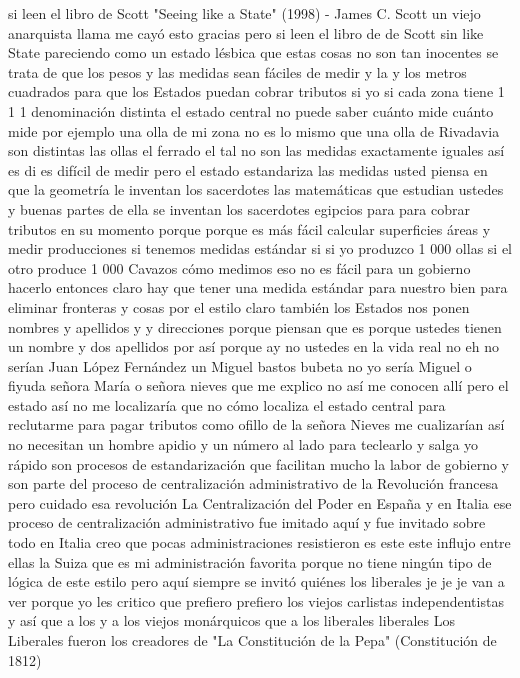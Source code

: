si leen el libro de Scott
"Seeing like a State" (1998) - James C. Scott
un viejo anarquista llama me cayó esto
gracias pero si leen el libro de de Scott sin like State
pareciendo como un estado lésbica que estas cosas no son tan inocentes se trata de que los pesos y las medidas sean fáciles de medir
y la y los metros cuadrados para que los Estados puedan cobrar tributos si yo si cada zona tiene 1 1 1 denominación distinta
el estado central no puede saber cuánto mide cuánto mide por ejemplo una olla de mi zona no es lo mismo que una olla de Rivadavia
son distintas las ollas el ferrado el tal no son las medidas exactamente iguales así es di es difícil de medir
pero el estado estandariza las medidas usted piensa en que la geometría le inventan los sacerdotes las matemáticas que estudian ustedes
y buenas partes de ella se inventan los sacerdotes egipcios para para cobrar tributos en su momento porque porque es más fácil calcular superficies áreas
y medir producciones si tenemos medidas estándar si si yo produzco 1 000 ollas si el otro produce 1 000 Cavazos
cómo medimos eso no es fácil para un gobierno hacerlo entonces claro hay que tener una medida estándar para nuestro bien
para eliminar fronteras y cosas por el estilo claro también los Estados nos ponen nombres y apellidos y y direcciones porque piensan que es
porque ustedes tienen un nombre y dos apellidos por así porque ay no ustedes en la vida real no eh no serían Juan López Fernández un Miguel bastos bubeta
no yo sería Miguel o fiyuda señora María o señora nieves que me explico no
así me conocen allí pero el estado así no me localizaría que no
cómo localiza el estado central para reclutarme para pagar tributos como ofillo de la señora Nieves
me cualizarían así no necesitan un hombre apidio y un número al lado para teclearlo y salga yo rápido
son procesos de estandarización que facilitan mucho la labor de gobierno y son parte
del proceso de centralización administrativo de la Revolución francesa pero cuidado esa revolución
La Centralización del Poder en España y en Italia
ese proceso de centralización administrativo fue imitado aquí y fue invitado sobre todo en Italia
creo que pocas administraciones resistieron es este este influjo entre ellas la Suiza que es mi administración favorita porque no tiene ningún tipo de lógica de este estilo
pero aquí siempre se invitó quiénes los liberales je je je van a ver porque yo les critico
que prefiero prefiero los viejos carlistas independentistas y así que a los y a los viejos monárquicos que a los liberales liberales
Los Liberales fueron los creadores de "La Constitución de la Pepa" (Constitución de 1812)

